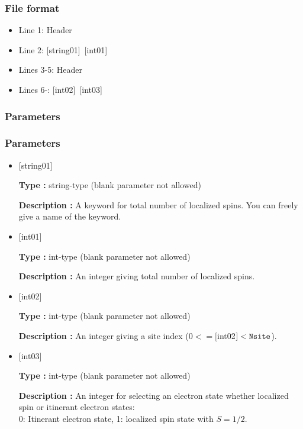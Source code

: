 \subsubsection{File format}
\begin{itemize}
   \item  Line 1:  Header
   \item  Line 2:   [string01]~[int01]
   \item  Lines 3-5:  Header
   \item  Lines 6-:  [int02]~[int03]
  \end{itemize}
 \subsubsection{Parameters}
 \subsubsection{Parameters}
 \begin{itemize}


 \item  $[$string01$]$

 {\bf Type :} string-type (blank parameter not allowed)

{\bf Description :} A keyword for total number of localized spins. You can freely give a name of the keyword.


  \item  $[$int01$]$

 {\bf Type :} int-type (blank parameter not allowed)

{\bf Description :} An integer giving total number of localized spins.

 
  \item  $[$int02$]$

 {\bf Type :} int-type (blank parameter not allowed)

{\bf Description :} An integer giving a site index ($0<= [$int02$] <\verb|Nsite|$).

 
  \item  $[$int03$]$

 {\bf Type :} int-type (blank parameter not allowed)

{\bf Description :} An integer for selecting an electron state whether localized spin or itinerant electron states:\\
{
0: Itinerant electron state, 1: localized spin state with $S=1/2$.
}\\
 \end{itemize}


